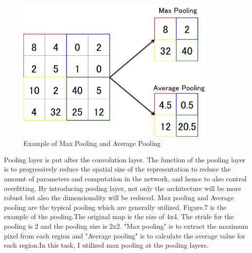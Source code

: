 \begin{figure}[H]

	\begin{center}
	\includegraphics[width=10cm]{picture/Pooling.png}
	\caption{Example of Max Pooling and Average Pooling}
	\end{center}
	\label{fig:seven}

\end{figure}









Pooling layer is put after the convolution layer. %
The function of the pooling layer is to progressively reduce the spatial size of the representation to reduce the amount of parameters and computation in the network, and hence to also control overfitting.
By introducing pooling layer, not only the architecture will be more robust but also the dimensionality will be reduced. Max pooling and Average pooling are the typical pooling which are generally utilized. Figure.7 is the example of the pooling.The original map is the size of 4x4. The stride for the pooling is 2 and the pooling size is 2x2. "Max pooling" is to extract the maximum pixel from each region and "Average pooling" is to calculate the average value for each region.In this task, I utilized max pooling at the pooling layers.



